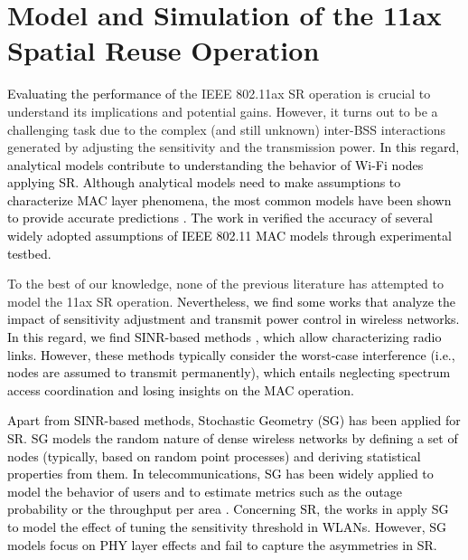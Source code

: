 \documentclass{ieeeaccess}
\begin{document}
\section{Model and Simulation of the 11ax Spatial Reuse Operation}
\label{section:analytical_model}

\textcolor{black}{Evaluating the performance of} the IEEE 802.11ax SR operation is crucial to understand its implications and potential gains. However, it turns out to be a challenging task due to the complex (and still unknown) inter-BSS interactions generated by adjusting the sensitivity and the transmission power. \textcolor{black}{In this regard, analytical models contribute to understanding the behavior of Wi-Fi nodes applying SR. Although analytical models need to make assumptions to characterize MAC layer phenomena, the most common models have been shown to provide accurate predictions \cite{malone2007verification, huang2010validity}. The work in \cite{malone2007verification} verified the accuracy of several widely adopted assumptions of IEEE 802.11 MAC models through experimental testbed.}

To the best of our knowledge, none of the previous literature has attempted to model the 11ax SR operation. \textcolor{black}{Nevertheless, we find some works that analyze the impact of sensitivity adjustment and transmit power control in wireless networks. In this regard, we find SINR-based methods \cite{gupta2000capacity, guo2003spatial}, which allow characterizing radio links. However, these methods typically consider the worst-case interference (i.e., nodes are assumed to transmit permanently), which entails neglecting spectrum access coordination and losing insights on the MAC operation.}

\textcolor{black}{Apart from SINR-based methods, Stochastic Geometry (SG) has been applied for SR. SG models the random nature of dense wireless networks by defining a set of nodes (typically, based on random point processes) and deriving statistical properties from them. In telecommunications, SG has been widely applied to model the behavior of users and to estimate metrics such as the outage probability or the throughput per area \cite{elsawy2016modeling}. Concerning SR, the works in \cite{zhao2016stochastic, zhang2015stochastic, iwata2019stochastic} apply SG to model the effect of tuning the sensitivity threshold in WLANs. However, SG models focus on PHY layer effects and fail to capture the asymmetries in SR.}
\end{document}
